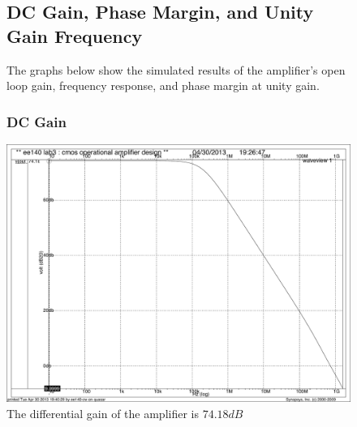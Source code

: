 \documentclass[]{article}
\begin{document}
		
		\begin{figure}
			\subsection{DC Gain, Phase Margin, and Unity Gain Frequency}
			The graphs below show the simulated results of the amplifier's open loop gain, frequency response, and phase margin at unity gain.
				\subsubsection{DC Gain}
				\includegraphics[width=1.1\textwidth]{diff_gain_DC.pdf}
				\caption{The differential gain of the amplifier is $74.18dB$}
		\end{figure}
		
\end{document}
